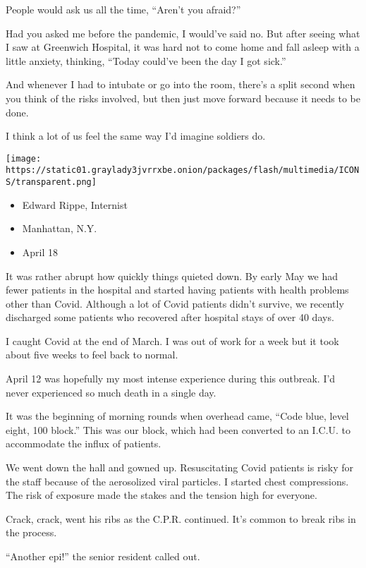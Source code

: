 People would ask us all the time, ``Aren't you afraid?''

Had you asked me before the pandemic, I would've said no. But after
seeing what I saw at Greenwich Hospital, it was hard not to come home
and fall asleep with a little anxiety, thinking, ``Today could've been
the day I got sick.''

And whenever I had to intubate or go into the room, there's a split
second when you think of the risks involved, but then just move forward
because it needs to be done.

I think a lot of us feel the same way I'd imagine soldiers do.

\texttt{[image: https://static01.graylady3jvrrxbe.onion/packages/flash/multimedia/ICONS/transparent.png]}

\begin{itemize}
\tightlist
\item
  Edward Rippe, Internist
\item
  Manhattan, N.Y.
\item
  April 18
\end{itemize}

It was rather abrupt how quickly things quieted down. By early May we
had fewer patients in the hospital and started having patients with
health problems other than Covid. Although a lot of Covid patients
didn't survive, we recently discharged some patients who recovered after
hospital stays of over 40 days.

I caught Covid at the end of March. I was out of work for a week but it
took about five weeks to feel back to normal.

April 12 was hopefully my most intense experience during this outbreak.
I'd never experienced so much death in a single day.

It was the beginning of morning rounds when overhead came, ``Code blue,
level eight, 100 block.'' This was our block, which had been converted
to an I.C.U. to accommodate the influx of patients.

We went down the hall and gowned up. Resuscitating Covid patients is
risky for the staff because of the aerosolized viral particles. I
started chest compressions. The risk of exposure made the stakes and the
tension high for everyone.

Crack, crack, went his ribs as the C.P.R. continued. It's common to
break ribs in the process.

``Another epi!'' the senior resident called out.

